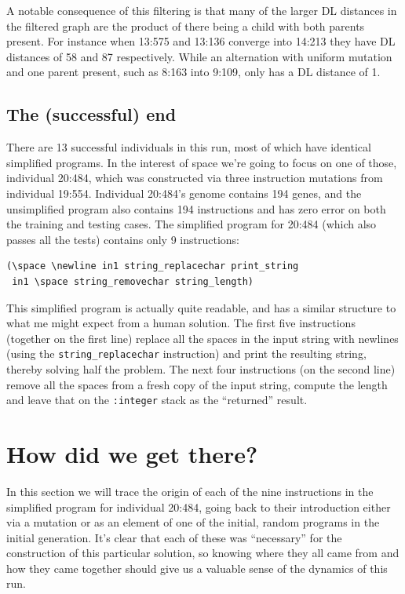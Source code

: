 A notable consequence of this filtering is that many of the larger DL distances in
the filtered graph are the product of there being a child with both parents present.
For instance when 13:575 and 13:136 converge into 14:213 they have DL distances of
58 and 87 respectively. While an alternation with uniform mutation and one parent present,
such as 8:163 into 9:109,  only has a DL distance of 1.

\subsection{The (successful) end}
\label{sec:successfulEnd}


There are 13 successful individuals
in this run, most of which have identical simplified
programs. In the interest of space we're going to focus on one of those, 
individual 20:484, which was constructed via three instruction mutations
from individual 19:554.
Individual 20:484's genome contains 194 genes, and the unsimplified 
program also contains 194 instructions and has zero error on both
the training and testing cases.
The simplified program for 20:484 (which also passes all the tests)
contains only 9 instructions:
\begin{verbatim}
(\space \newline in1 string_replacechar print_string
 in1 \space string_removechar string_length)
\end{verbatim}
This simplified program is actually quite readable, and has a similar
structure to what me might expect from a human solution.
The first five 
instructions (together on the first line) replace all the spaces in the input string 
with newlines (using the \texttt{string\_replacechar} instruction) and print the 
resulting string, thereby solving half the problem. 
The next four instructions (on the second line) remove all the spaces from
a fresh copy of the input string, compute the length and leave that on the
\texttt{:integer} stack as the ``returned'' result.

\section{How did we get there?}
\label{sec:howDidWeGetThere}

In this section we will trace the origin of each of the nine instructions
in the simplified program for individual 20:484,
going back to their introduction either via a mutation or as an element 
of one of the initial, random programs in the initial generation. It's clear
that each of these was ``necessary'' for the construction of this particular
solution, so knowing where they all came from and how they came together
should give us a valuable sense of the dynamics of this run. 

